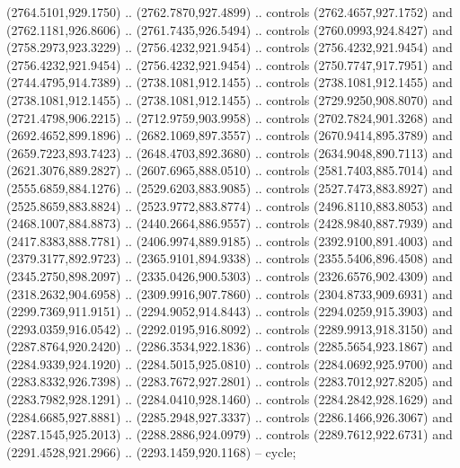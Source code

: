 \begin{scope}[shift={(19.44451,-318.97965)}]
\begin{scope}[shift={(-2093.8013,-1176.4989)}]
\begin{scope}
\begin{scope}
\begin{scope}
\begin{scope}[cm={{0.5939,0.0,0.0,0.5939,(746.01496,1124.7564)}}]
              (2764.5101,929.1750) .. (2762.7870,927.4899) .. controls (2762.4657,927.1752)
              and (2762.1181,926.8606) .. (2761.7435,926.5494) .. controls
              (2760.0993,924.8427) and (2758.2973,923.3229) .. (2756.4232,921.9454) ..
              controls (2756.4232,921.9454) and (2756.4232,921.9454) .. (2756.4232,921.9454)
              .. controls (2750.7747,917.7951) and (2744.4795,914.7389) ..
              (2738.1081,912.1455) .. controls (2738.1081,912.1455) and (2738.1081,912.1455)
              .. (2738.1081,912.1455) .. controls (2729.9250,908.8070) and
              (2721.4798,906.2215) .. (2712.9759,903.9958) .. controls (2702.7824,901.3268)
              and (2692.4652,899.1896) .. (2682.1069,897.3557) .. controls
              (2670.9414,895.3789) and (2659.7223,893.7423) .. (2648.4703,892.3680) ..
              controls (2634.9048,890.7113) and (2621.3076,889.2827) .. (2607.6965,888.0510)
              .. controls (2581.7403,885.7014) and (2555.6859,884.1276) ..
              (2529.6203,883.9085) .. controls (2527.7473,883.8927) and (2525.8659,883.8824)
              .. (2523.9772,883.8774) .. controls (2496.8110,883.8053) and
              (2468.1007,884.8873) .. (2440.2664,886.9557) .. controls (2428.9840,887.7939)
              and (2417.8383,888.7781) .. (2406.9974,889.9185) .. controls
              (2392.9100,891.4003) and (2379.3177,892.9723) .. (2365.9101,894.9338) ..
              controls (2355.5406,896.4508) and (2345.2750,898.2097) .. (2335.0426,900.5303)
              .. controls (2326.6576,902.4309) and (2318.2632,904.6958) ..
              (2309.9916,907.7860) .. controls (2304.8733,909.6931) and (2299.7369,911.9151)
              .. (2294.9052,914.8443) .. controls (2294.0259,915.3903) and
              (2293.0359,916.0542) .. (2292.0195,916.8092) .. controls (2289.9913,918.3150)
              and (2287.8764,920.2420) .. (2286.3534,922.1836) .. controls
              (2285.5654,923.1867) and (2284.9339,924.1920) .. (2284.5015,925.0810) ..
              controls (2284.0692,925.9700) and (2283.8332,926.7398) .. (2283.7672,927.2801)
              .. controls (2283.7012,927.8205) and (2283.7982,928.1291) ..
              (2284.0410,928.1460) .. controls (2284.2842,928.1629) and (2284.6685,927.8881)
              .. (2285.2948,927.3337) .. controls (2286.1466,926.3067) and
              (2287.1545,925.2013) .. (2288.2886,924.0979) .. controls (2289.7612,922.6731)
              and (2291.4528,921.2966) .. (2293.1459,920.1168) -- cycle;


\end{scope}
\end{scope}
\end{scope}
\end{scope}
\end{scope}
\end{scope}
